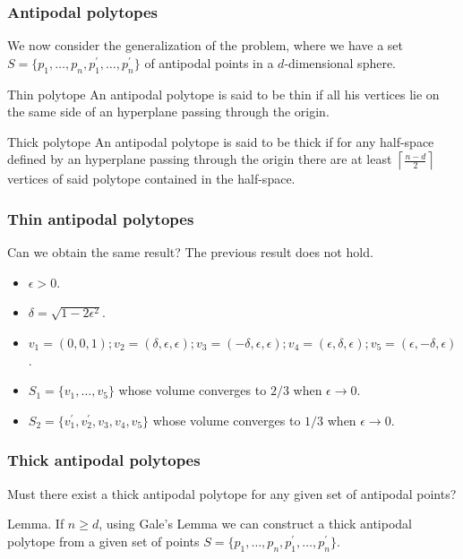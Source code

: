\documentclass{beamer}
\begin{document}
\begin{frame}
\frametitle{Antipodal polytopes}
We now consider the generalization of the problem, where we have a set $S = \{p_{1},\dots,p_{n},p_{1}^{\prime},\dots,p_{n}^{\prime}\}$ of antipodal points in a $d$-dimensional sphere.\pause
\begin{block}{Thin polytope}
An antipodal polytope is said to be thin if all his vertices lie on the same side of an hyperplane passing through the origin.
\end{block}\pause
\begin{block}{Thick polytope}
An antipodal polytope is said to be thick if for any half-space defined by an hyperplane passing through the origin there are at least $\left \lceil{\frac{n-d}{2}}\right \rceil $ vertices of said polytope contained in the half-space.
\end{block}
\end{frame}

\begin{frame}
\frametitle{Thin antipodal polytopes}
\begin{alertblock}{Can we obtain the same result?}
The previous result does not hold.
\end{alertblock}\pause
\begin{example}
\begin{itemize}
\item<2-> $\epsilon>0$.
\item<3-> $\delta = \sqrt{1-2\epsilon^{2}}$.
\item<4-> $v_{1} = (0,0,1);v_{2}= (\delta,\epsilon,\epsilon);v_{3}= (-\delta,\epsilon,\epsilon);v_{4}= (\epsilon,\delta,\epsilon);v_{5}= (\epsilon,-\delta,\epsilon)$.
\item<5-> $S_{1} = \{v_{1},\dots,v_{5}\}$ whose volume converges to $2/3$ when $\epsilon\to 0$.
\item<6-> $S_{2} = \{v_{1}^{\prime},v_{2}^{\prime},v_{3},v_{4},v_{5}\}$ whose volume converges to $1/3$ when $\epsilon\to 0$.
\end{itemize}
\end{example}
\end{frame}

\begin{frame}
\frametitle{Thick antipodal polytopes}
Must there exist a thick antipodal polytope for any given set of antipodal points?
\begin{alertblock}{Lemma.}
If $n\geq d$, using Gale's Lemma we can construct a thick antipodal polytope from a given set of points $S= \{p_{1},\dots,p_{n},p_{1}^{\prime},\dots,p_{n}^{\prime}\}$.
\end{alertblock}

\end{frame}
\end{document}
